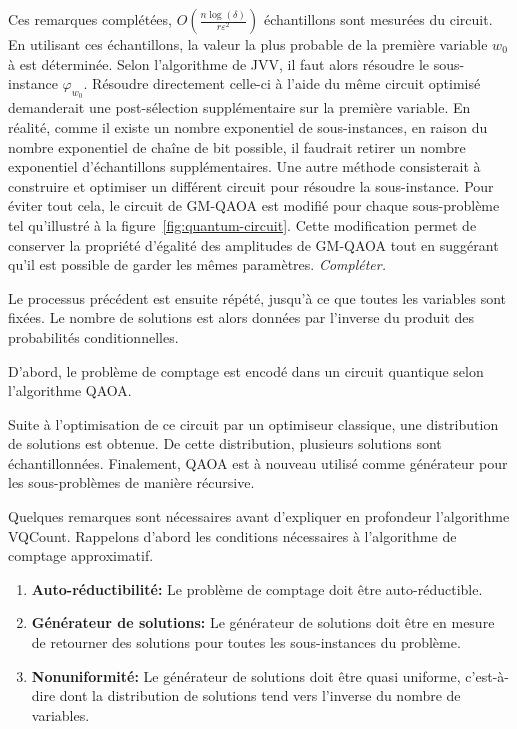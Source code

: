 Ces remarques complétées, $O(\frac{n \log (\delta)}{r \varepsilon^{2}})$ échantillons sont mesurées du circuit. En utilisant ces échantillons, la valeur la plus probable de la première variable $w_{0}$ à est déterminée. Selon l'algorithme de JVV, il faut alors résoudre le sous-instance $\varphi_{w_{0}}$. Résoudre directement celle-ci à l'aide du même circuit optimisé demanderait une post-sélection supplémentaire sur la première variable. En réalité, comme il existe un nombre exponentiel de sous-instances, en raison du nombre exponentiel de chaîne de bit possible, il faudrait retirer un nombre exponentiel d'échantillons supplémentaires. Une autre méthode consisterait à construire et optimiser un différent circuit pour résoudre la sous-instance. Pour éviter tout cela, le circuit de GM-QAOA est modifié pour chaque sous-problème tel qu'illustré à la figure~\ref{fig:quantum-circuit}. Cette modification permet de conserver la propriété d'égalité des amplitudes de GM-QAOA tout en suggérant qu'il est possible de garder les mêmes paramètres. \textcolor{mydarkred}{\textit{Compléter.}}

Le processus précédent est ensuite répété, jusqu'à ce que toutes les variables sont fixées. Le nombre de solutions est alors données par l'inverse du produit des probabilités conditionnelles.

D'abord, le problème de comptage est encodé dans un circuit quantique selon l'algorithme QAOA. 




Suite à l'optimisation de ce circuit par un optimiseur classique, une distribution de solutions est obtenue. De cette distribution, plusieurs solutions sont échantillonnées. Finalement, QAOA est à nouveau utilisé comme générateur pour les sous-problèmes de manière récursive.




Quelques remarques sont nécessaires avant d'expliquer en profondeur l'algorithme VQCount. Rappelons d'abord les conditions nécessaires à l'algorithme de comptage approximatif.

\begin{enumerate}[(1)]
    \item \textbf{Auto-réductibilité:} Le problème de comptage doit être auto-réductible.
    \item \textbf{Générateur de solutions:} Le générateur de solutions doit être en mesure de retourner des solutions pour toutes les sous-instances du problème.
    \item \textbf{Nonuniformité:} Le générateur de solutions doit être quasi uniforme, c'est-à-dire dont la distribution de solutions tend vers l'inverse du nombre de variables.
\end{enumerate}

